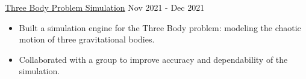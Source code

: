 \documentclass[9pt]{resume}
\begin{document}
\begin{experiencelist}
        \experiencenocompany
            {\href{https://github.com/TheSharkhead2/third_body_simulation}{Three Body Problem Simulation}}
            {Nov 2021 - Dec 2021}
            {\begin{itemize}[noitemsep, topsep=1pt]
                \item Built a simulation engine for the Three Body problem: modeling the chaotic motion of three gravitational bodies. 
                \item Collaborated with a group to improve accuracy and dependability of the simulation.
            \end{itemize}}
    \end{experiencelist}
    \vspace{-0.2cm}
\end{document}

